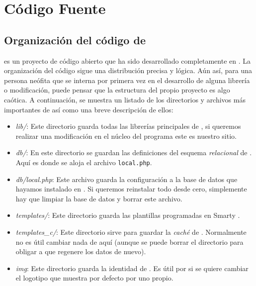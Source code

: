 \chapter{Código Fuente} 
\label{appendix:apendice-b}

\section{Organización del código de \tiki{}}
\label{appendix:organizacion-codigo}

\tiki{} es un proyecto de código abierto que ha sido desarrollado completamente en \php{}. La organización del código sigue una distribución precisa y lógica. Aún así, para una persona neófita que se interna por primera vez en el desarrollo de alguna librería o modificación, puede pensar que la estructura del propio proyecto es algo caótica. A continuación, se muestra un listado de los directorios y archivos más importantes de \tiki{} así como una breve descripción de ellos:
 
\begin{itemize}
\item \textit{lib/}: Este directorio guarda todas las librerías principales de \tiki{}, si queremos realizar una modificación en el núcleo del programa este es nuestro sitio.

\item \textit{db/}: En este directorio se guardan las definiciones del esquema \textit{relacional} de \tiki{}. Aquí es donde se aloja el archivo \texttt{local.php}.

\item \textit{db/local.php}: Este archivo guarda la configuración a la base de datos que hayamos instalado en \tiki{}. Si queremos reinstalar todo desde cero, simplemente hay que limpiar la base de datos y borrar este archivo.

\item \textit{templates/}: Este directorio guarda las plantillas programadas en Smarty \cite{web:smarty}.

\item \textit{templates\_c/}: Este directorio sirve para guardar la \textit{caché} de \tiki{}. Normalmente no es útil cambiar nada de aquí (aunque se puede borrar el directorio para obligar a que \tiki{} regenere los datos de nuevo).

\item \textit{img}: Este directorio guarda la identidad de \tiki{}. Es útil por si se quiere cambiar el logotipo que muestra por defecto por uno propio.
\end{itemize}

